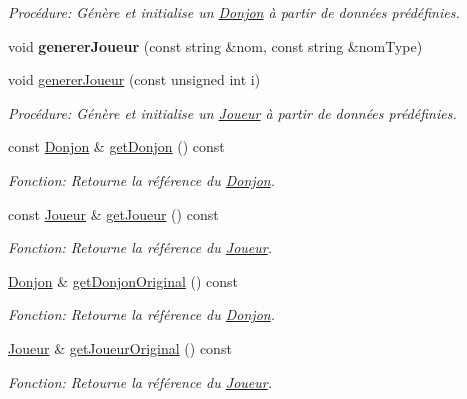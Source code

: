 \begin{DoxyCompactItemize}
\begin{DoxyCompactList}\small\item\em Procédure\+: Génère et initialise un \mbox{\hyperlink{classDonjon}{Donjon}} à partir de données prédéfinies. \end{DoxyCompactList}\item 
\mbox{\label{classJeu_aaf3bd9f9545c3854c74f42cc3c0cb58d}} 
void {\bfseries generer\+Joueur} (const string \&nom, const string \&nom\+Type)
\item 
void \mbox{\hyperlink{classJeu_ac4a466b8908c8ef5b308bbf27296322b}{generer\+Joueur}} (const unsigned int i)
\begin{DoxyCompactList}\small\item\em Procédure\+: Génère et initialise un \mbox{\hyperlink{classJoueur}{Joueur}} à partir de données prédéfinies. \end{DoxyCompactList}\item 
const \mbox{\hyperlink{classDonjon}{Donjon}} \& \mbox{\hyperlink{classJeu_ada75af8e4be937853af9c56dc087b337}{get\+Donjon}} () const
\begin{DoxyCompactList}\small\item\em Fonction\+: Retourne la référence du \mbox{\hyperlink{classDonjon}{Donjon}}. \end{DoxyCompactList}\item 
const \mbox{\hyperlink{classJoueur}{Joueur}} \& \mbox{\hyperlink{classJeu_ac599e64df949f108bcbf87551f568550}{get\+Joueur}} () const
\begin{DoxyCompactList}\small\item\em Fonction\+: Retourne la référence du \mbox{\hyperlink{classJoueur}{Joueur}}. \end{DoxyCompactList}\item 
\mbox{\hyperlink{classDonjon}{Donjon}} \& \mbox{\hyperlink{classJeu_a439365f38115af1b3cfcd1cb1c3fa6ce}{get\+Donjon\+Original}} () const
\begin{DoxyCompactList}\small\item\em Fonction\+: Retourne la référence du \mbox{\hyperlink{classDonjon}{Donjon}}. \end{DoxyCompactList}\item 
\mbox{\hyperlink{classJoueur}{Joueur}} \& \mbox{\hyperlink{classJeu_a22122d0bdd43f02109ef25d6874686c8}{get\+Joueur\+Original}} () const
\begin{DoxyCompactList}\small\item\em Fonction\+: Retourne la référence du \mbox{\hyperlink{classJoueur}{Joueur}}. \end{DoxyCompactList}\item 

\end{DoxyCompactItemize}
